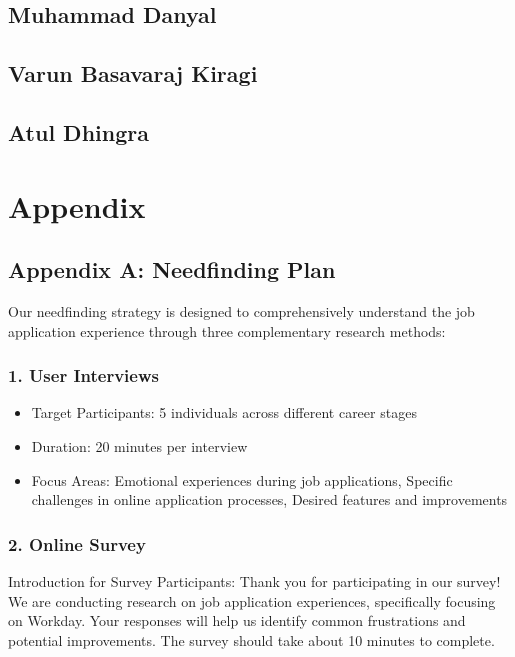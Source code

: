 \documentclass[
	letterpaper, %
]{jdf}
\begin{document}
\begin{sloppypar}
\newpage

\subsection{Muhammad Danyal}

\newpage

\subsection{Varun Basavaraj Kiragi}

\newpage

\subsection{Atul Dhingra}

\newpage

\section{Appendix}
\subsection{Appendix A: Needfinding Plan}

Our needfinding strategy is designed to comprehensively understand the job application experience through three complementary research methods:

\subsubsection{1. User Interviews}
\begin{itemize}
\item Target Participants: 5 individuals across different career stages
\item Duration: 20 minutes per interview
\item Focus Areas: Emotional experiences during job applications, Specific challenges in online application processes, Desired features and improvements
\end{itemize}
\hfill \break

\subsubsection{2. Online Survey}
Introduction for Survey Participants:
Thank you for participating in our survey! We are conducting research on job application experiences, specifically focusing on Workday. Your responses will help us identify common frustrations and potential improvements. The survey should take about 10 minutes to complete.


\end{sloppypar}
\end{document}
